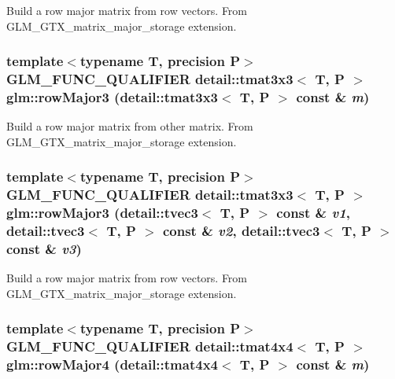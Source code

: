 Build a row major matrix from row vectors. From GLM\_\-GTX\_\-matrix\_\-major\_\-storage extension. \hypertarget{group__gtx__matrix__major__storage_g292c13103d16ead7193def8fcbcfa9fb}{
\subsubsection[rowMajor3]{\setlength{\rightskip}{0pt plus 5cm}template$<$typename T, precision P$>$ GLM\_\-FUNC\_\-QUALIFIER detail::tmat3x3$<$ T, P $>$ glm::rowMajor3 (detail::tmat3x3$<$ T, P $>$ const \& {\em m})}}
\label{group__gtx__matrix__major__storage_g292c13103d16ead7193def8fcbcfa9fb}


Build a row major matrix from other matrix. From GLM\_\-GTX\_\-matrix\_\-major\_\-storage extension. \hypertarget{group__gtx__matrix__major__storage_g3839659b9641777b1bbc98122efc1320}{
\subsubsection[rowMajor3]{\setlength{\rightskip}{0pt plus 5cm}template$<$typename T, precision P$>$ GLM\_\-FUNC\_\-QUALIFIER detail::tmat3x3$<$ T, P $>$ glm::rowMajor3 (detail::tvec3$<$ T, P $>$ const \& {\em v1}, \/  detail::tvec3$<$ T, P $>$ const \& {\em v2}, \/  detail::tvec3$<$ T, P $>$ const \& {\em v3})}}
\label{group__gtx__matrix__major__storage_g3839659b9641777b1bbc98122efc1320}


Build a row major matrix from row vectors. From GLM\_\-GTX\_\-matrix\_\-major\_\-storage extension. \hypertarget{group__gtx__matrix__major__storage_g77df85015848f4812005392d9c78b8a4}{
\subsubsection[rowMajor4]{\setlength{\rightskip}{0pt plus 5cm}template$<$typename T, precision P$>$ GLM\_\-FUNC\_\-QUALIFIER detail::tmat4x4$<$ T, P $>$ glm::rowMajor4 (detail::tmat4x4$<$ T, P $>$ const \& {\em m})}}
\label{group__gtx__matrix__major__storage_g77df85015848f4812005392d9c78b8a4}


